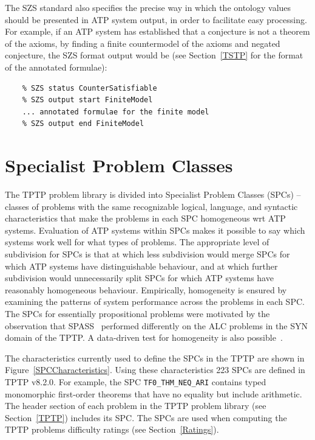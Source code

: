 \documentclass[runningheads]{llncs}
\begin{document}
The SZS standard also specifies the precise way in which the ontology values should be presented
in ATP system output, in order to facilitate easy processing.
For example, if an ATP system has established that a conjecture is not a theorem of the axioms,
by finding a finite countermodel of the axioms and negated conjecture, the SZS format output 
would be (see Section~\ref{TSTP} for the format of the annotated formulae): \\

\begin{minipage}{\textwidth}
\begin{verbatim}
    % SZS status CounterSatisfiable
    % SZS output start FiniteModel
    ... annotated formulae for the finite model 
    % SZS output end FiniteModel
\end{verbatim}
\end{minipage}

\vspace*{1em}

\section{Specialist Problem Classes}
\label{SPCs}

The TPTP problem library is divided into Specialist Problem Classes (SPCs) -- classes of problems 
with the same recognizable logical, language, and syntactic characteristics that make the
problems in each SPC homogeneous wrt ATP systems.
Evaluation of ATP systems within SPCs makes it possible to say which systems work well for what 
types of problems. 
The appropriate level of subdivision for SPCs is that at which less subdivision would merge 
SPCs for which ATP systems have distinguishable behaviour, and at which further subdivision
would unnecessarily split SPCs for which ATP systems have reasonably homogeneous behaviour.
Empirically, homogeneity is ensured by examining the patterns of system performance across the 
problems in each SPC. 
The SPCs for essentially propositional problems were motivated by the observation that 
SPASS~\cite{WA+99} performed differently on the ALC problems in the SYN domain of the TPTP.
A data-driven test for homogeneity is also possible~\cite{FS02}.

The characteristics currently used to define the SPCs in the TPTP are shown in 
Figure~\ref{SPCCharacteristics}.
Using these characteristics 223 SPCs are defined in TPTP v8.2.0. 
For example, the SPC
{\tt TF0\_THM\_NEQ\_ARI} contains typed monomorphic first-order theorems that have no equality but 
include arithmetic.
The header section of each problem in the TPTP problem library (see Section~\ref{TPTP}) includes 
its SPC.
The SPCs are used when computing the TPTP problems difficulty ratings (see Section~\ref{Ratings}).
\end{document}

